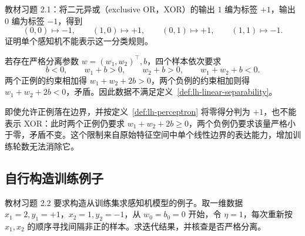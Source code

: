 \begin{example}
\label{ex:lh-perceptron-xor}
教材习题 2.1：将二元异或（exclusive OR，XOR）的输出 $1$ 编为标签 $+1$，输出 $0$ 编为标签 $-1$，得到
\[
(0,0)\mapsto-1,\qquad
(1,0)\mapsto+1,\qquad
(0,1)\mapsto+1,\qquad
(1,1)\mapsto-1.
\]
证明单个感知机不能表示这一分类规则。
\end{example}

\begin{solve}
若存在严格分离参数 $w=(w_1,w_2)^\top,b$，四个样本依次要求
\[
b<0,\qquad w_1+b>0,\qquad w_2+b>0,\qquad w_1+w_2+b<0.
\]
两个正例的约束相加得 $w_1+w_2+2b>0$，两个负例的约束相加则得 $w_1+w_2+2b<0$，矛盾。因此数据不满足定义~\ref{def:lh-linear-separability}。

即使允许正例落在边界，并按定义~\ref{def:lh-perceptron} 将零得分判为 $+1$，也不能表示 XOR：此时两个正例仍要求 $w_1+w_2+2b\geq0$，两个负例仍要求该量严格小于零，矛盾不变。这个限制来自原始特征空间中单个线性边界的表达能力，增加训练轮数无法消除它。
\end{solve}

\subsection{自行构造训练例子}
\label{subsec:lh-perceptron-constructed-example}

\begin{example}
\label{ex:lh-perceptron-constructed}
教材习题 2.2 要求构造从训练集求感知机模型的例子。取一维数据 $x_1=2,y_1=+1$，$x_2=1,y_2=-1$，从 $w_0=b_0=0$ 开始，令 $\eta=1$，每次重新按 $x_1,x_2$ 的顺序寻找间隔非正的样本。求迭代结果，并核查是否严格分离。
\end{example}

